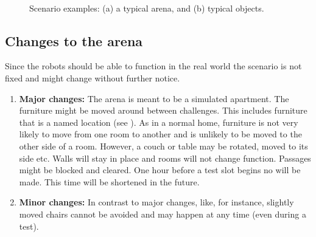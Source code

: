 \begin{figure}[tbp]
	\centering
	 ~ 
	\caption{Scenario examples: (a) a typical arena, and (b) typical objects.}
	\label{fig:arena}
\end{figure}



\subsection{Changes to the arena}
\label{rule:scenario_changes}

Since the robots should be able to function in the real world the scenario is not fixed and might change without further notice.
\begin{enumerate}
	\item \textbf{Major changes:} 
	The arena is meant to be a simulated apartment. 
	The furniture might be moved around between challenges. 
	This includes furniture that is a named location (see ).
	As in a normal home, furniture is not very likely to move from one room to another and is unlikely to be moved to the other side of a room.
	However, a couch or table may be rotated, moved to its side etc. 
	Walls will stay in place and rooms will not change function.
	Passages might be blocked and cleared. 
	One hour before a test slot begins no  will be made.
	This time will be shortened in the future. 
	\item \textbf{Minor changes:} In contrast to major changes,  like, for instance, slightly moved chairs cannot be avoided and may happen at any time (even during a test). 
\end{enumerate}


